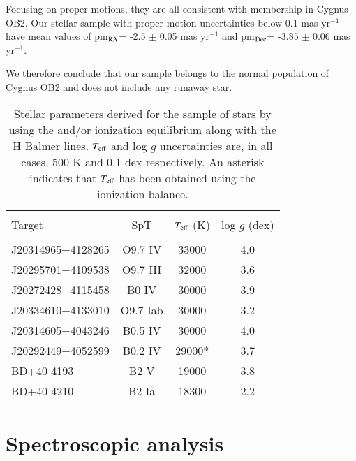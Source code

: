 \documentclass{aa} %
\begin{document}
Focusing on proper motions, they are all consistent with membership in Cygnus OB2. Our stellar sample with proper motion uncertainties below 0.1 mas yr$^{-1}$ have  mean values of pm$_{\rm RA}$=  -2.5 $\pm$ 0.05 mas yr$^{-1}$ and  pm$_{\rm Dec}$= -3.85 $\pm$ 0.06 mas yr$^{-1}$.


We therefore conclude that our sample belongs to the normal population of Cygnus OB2 and does not include any runaway star.


  \begin{table}[b!]
	\centering
	\caption{Stellar parameters derived for the sample of stars by using the  and/or  ionization equilibrium along with the H Balmer lines. $T_{\rm eff}$ and log $g$ uncertainties are, in all cases, 500 K and 0.1 dex respectively. An asterisk indicates that $T_{\rm eff}$ has been obtained using the  ionization balance. }
	\label{table3a}
		\begin{tabular}{lccc}
		\hline   
		\hline\\[-1.8ex]
    	\small{Target} & \small{SpT}& \small{$T_{\rm eff}$ (K)}& \small{log $g$ (dex)} \\
 \hline\\[-1.5ex] 

\small{J20314965+4128265} & \small{O9.7 IV} &\small{33000}& \small{4.0}\\ 
\small{J20295701+4109538} & \small{O9.7 III} & \small{32000}& \small{3.6}\\ 	
\small{J20272428+4115458} & \small{B0 IV}& \small{30000}& \small{3.9}\\
\small{J20334610+4133010} & \small{O9.7 Iab}&  \small{30000}& \small{3.2}\\
\small{J20314605+4043246} & \small{B0.5 IV}&  \small{30000}& \small{4.0}\\  
\small{J20292449+4052599} & \small{B0.2 IV}&  \small{29000*}& \small{3.7}\\   
\small{BD+40 4193} & \small{B2 V}&   \small{19000}& \small{3.8}\\ 
\small{BD+40 4210} & \small{B2 Ia}&   \small{18300}& \small{2.2}\\
\hline
		\end{tabular}
\end{table}

\section{Spectroscopic analysis}\label{sect3}
\end{document}

